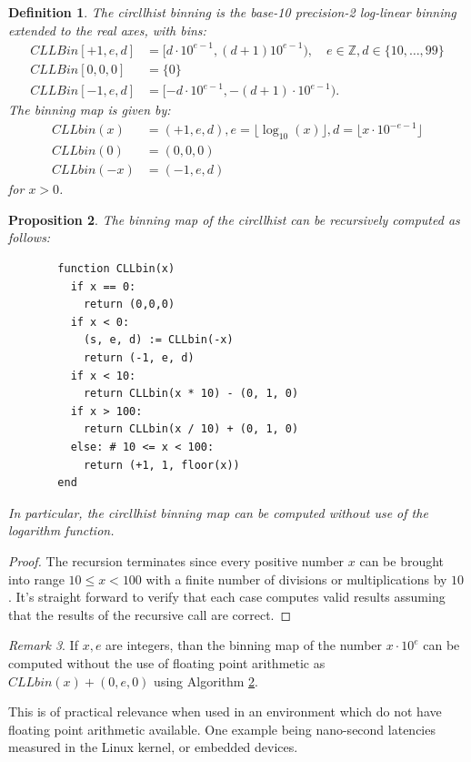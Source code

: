\documentclass{article}
\theoremstyle{plain}
\newtheorem{definition}{Definition}[section]
\newtheorem{proposition}[definition]{Proposition}
\theoremstyle{remark}
\newtheorem{remark}[definition]{Remark}
\newcommand{\IZ}{\mathbb{Z}}
\newcommand{\floor}[1]{\lfloor#1\rfloor}
\begin{document}
\begin{definition}
  The circllhist binning is the base-10 precision-2 log-linear binning extended to the real axes,
  with bins:
  \begin{align*}
    CLLBin[+1,e,d] &= [ d \cdot {10}^{e-1}, (d + 1) 10^{e-1} ), \quad e \in \IZ, d \in \{ 10, \dots, 99 \} \\
    CLLBin[0,0,0]  &= \{ 0 \} \\
    CLLBin[-1,e,d] &= [ -d \cdot {10}^{e-1}, -(d + 1) \cdot 10^{e-1} ).
  \end{align*}
  The binning map is given by:
  \begin{align*}
    CLLbin(x)  &= (+1, e, d), e = \floor{\log_{10}(x)}, d = \floor{x \cdot 10^{-e - 1}} \\
    CLLbin(0)  &= (0, 0, 0) \\
    CLLbin(-x) &= (-1, e, d)
  \end{align*}
  for $x > 0$.
\end{definition}

\begin{proposition} \label{prop:rec}
  The binning map of the circllhist can be recursively computed as follows:

  \begin{figure}[h]
  \begin{cetner}
    \begin{BVerbatim}
  function CLLbin(x)
    if x == 0:
      return (0,0,0)
    if x < 0:
      (s, e, d) := CLLbin(-x)
      return (-1, e, d)
    if x < 10:
      return CLLbin(x * 10) - (0, 1, 0)
    if x > 100:
      return CLLbin(x / 10) + (0, 1, 0)
    else: # 10 <= x < 100:
      return (+1, 1, floor(x))
  end
    \end{BVerbatim}
  \end{cetner}
  \end{figure}

  In particular, the circllhist binning map can be computed without use of the logarithm function.
\end{proposition}

\begin{proof}
  The recursion terminates since every positive number $x$ can be brought into range $10 \leq x <
  100$ with a finite number of divisions or multiplications by $10$.  It's straight forward to
  verify that each case computes valid results assuming that the results of the recursive call are
  correct.
\end{proof}

\begin{remark}
  If $x,e$ are integers, than the binning map of the number $x \cdot 10^{e}$ can be computed without
  the use of floating point arithmetic as $CLLbin(x) + (0,e,0)$ using Algorithm \ref{prop:rec}.

  This is of practical relevance when used in an environment which do not have floating
  point arithmetic available. One example being nano-second latencies measured in the Linux kernel,
  or embedded devices.
\end{remark}
\end{document}
